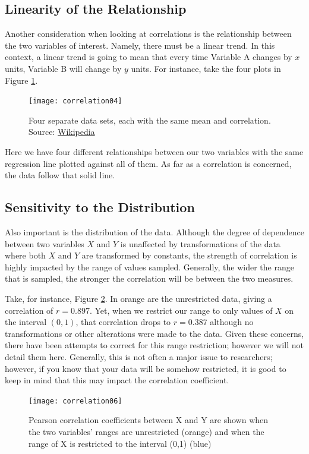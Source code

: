 \subsection{Linearity of the Relationship}
Another consideration when looking at correlations is the relationship between the two variables of interest. Namely, there must be a linear trend. In this context, a linear trend is going to mean that every time Variable A changes by \( x \) units, Variable B will change by \(y\) units. For instance, take the four plots in Figure \ref{fig:correlation04}.

\begin{figure}[h]
\texttt{[image: correlation04]}
\label{fig:correlation04}
\caption{Four separate data sets, each with the same mean and correlation. Source: \href{http://en.wikipedia.org/wiki/Correlation}{Wikipedia}}
\end{figure}

Here we have four different relationships between our two variables with the same regression line plotted against all of them. As far as a correlation is concerned, the data follow that solid line.

\subsection{Sensitivity to the Distribution}
Also important is the distribution of the data. Although the degree of dependence between two variables $X$ and $Y$ is unaffected by transformations of the data where both $X$ and $Y$ are transformed by constants, the strength of correlation is highly impacted by the range of values sampled. Generally, the wider the range that is sampled, the stronger the correlation will be between the two measures.

Take, for instance, Figure \ref{fig:correlation06}. In orange are the unrestricted data, giving a correlation of $r=0.897$. Yet, when we restrict our range to only values of $X$ on the interval $(0,1)$, that correlation drops to $r=0.387$ although no transformations or other alterations were made to the data. Given these concerns, there have been attempts to correct for this range restriction; however we will not detail them here. Generally, this is not often a major issue to researchers; however, if you know that your data will be somehow restricted, it is good to keep in mind that this may impact the correlation coefficient.

\begin{figure}[h]
\texttt{[image: correlation06]}
\caption{Pearson correlation coefficients between X and Y are shown when the two variables' ranges are unrestricted (orange) and when the range of X is restricted to the interval (0,1) (blue)}
\label{fig:correlation06}
\end{figure}

